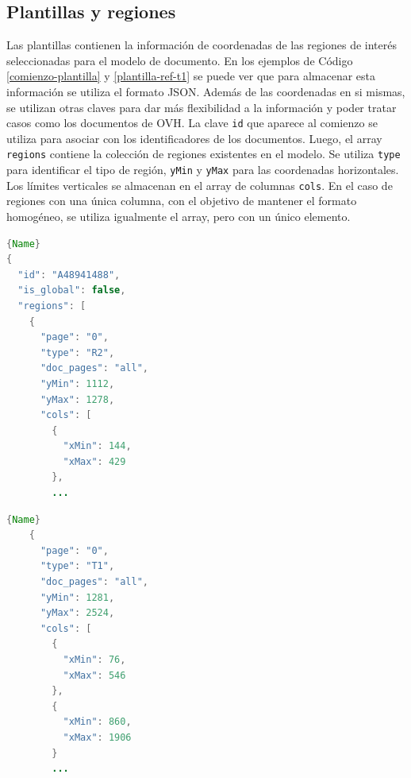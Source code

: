 \subsection{Plantillas y regiones}


Las plantillas contienen la información de coordenadas de las regiones de interés seleccionadas para el modelo de documento. En los ejemplos de Código \ref{comienzo-plantilla} y \ref{plantilla-ref-t1} se puede ver que para almacenar esta información se utiliza el formato JSON. Además de las coordenadas en si mismas, se utilizan otras claves para dar más flexibilidad a la información y poder tratar casos como los documentos de OVH. La clave \verb|id| que aparece al comienzo se utiliza para asociar con los identificadores de los documentos. Luego, el array \verb|regions| contiene la colección de regiones existentes en el modelo. Se utiliza \verb|type| para identificar el tipo de región, \verb|yMin| y \verb|yMax| para las coordenadas horizontales. Los límites verticales se almacenan en el array de columnas \verb|cols|. En el caso de regiones con una única columna, con el objetivo de mantener el formato homogéneo, se utiliza igualmente el array, pero con un único elemento.

\noindent\begin{minipage}{.45\textwidth}
    \begin{lstlisting}[language=Java,caption={Comienzo de la plantilla},label={comienzo-plantilla},frame=tlrb]{Name}
{
  "id": "A48941488",
  "is_global": false,
  "regions": [
    {
      "page": "0",
      "type": "R2",
      "doc_pages": "all",
      "yMin": 1112,
      "yMax": 1278,
      "cols": [
        {
          "xMin": 144,
          "xMax": 429
        },
        ...
    \end{lstlisting}
\end{minipage}\hfill
\begin{minipage}{.45\textwidth}
    \begin{lstlisting}[language=Java,caption={Región T1},label={plantilla-ref-t1},frame=tlrb]{Name}
    {
      "page": "0",
      "type": "T1",
      "doc_pages": "all",
      "yMin": 1281,
      "yMax": 2524,
      "cols": [
        {
          "xMin": 76,
          "xMax": 546
        },
        {
          "xMin": 860,
          "xMax": 1906
        }
        ...
    \end{lstlisting}
\end{minipage}

